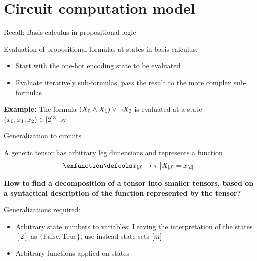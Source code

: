 \documentclass{beamer}
\begin{document}
    {\frame[plain]{\titlepage}}

    \showoutlineatsection


    \section{Circuit computation model}

    \begin{frame}{Recall: Basis calculus in propositional logic}
        \par

        Evaluation of propositional formulas at states in basis calculus:
        \begin{itemize}
            \item Start with the one-hot encoding state to be evaluated
            \item Evaluate iteratively sub-formulas, pass the result to the more complex sub-formulas
        \end{itemize}
            {\bf Example:} The formula $(X_{0}\land X_{1})\lor \lnot X_{2}$ is evaluated at a state $(x_{0},x_{1},x_{2})\in[2]^3$ by
        \begin{center}
            
        \end{center}

    \end{frame}


    \begin{frame}{Generalization to circuits}


        A generic tensor has arbitrary leg dimensions and represents a function
        \begin{align*}
            \exfunction \defcols \shortcatindices \rightarrow \hypercoreat{\indexedshortcatvariables}
        \end{align*}
%
        \begin{center}
            \bf How to find a decomposition of a tensor into smaller tensors, based on a syntactical description of the function represented by the tensor?
        \end{center}

        Generalizations required:
        \begin{itemize}
            \item Arbitrary state numbers to variables: Leaving the interpretation of the states $[2]$ as $\{\mathrm{False},\mathrm{True}\}$, use instead state sets $[m]$
            \item Arbitrary functions applied on states
        \end{itemize}

    \end{frame}
\end{document}
